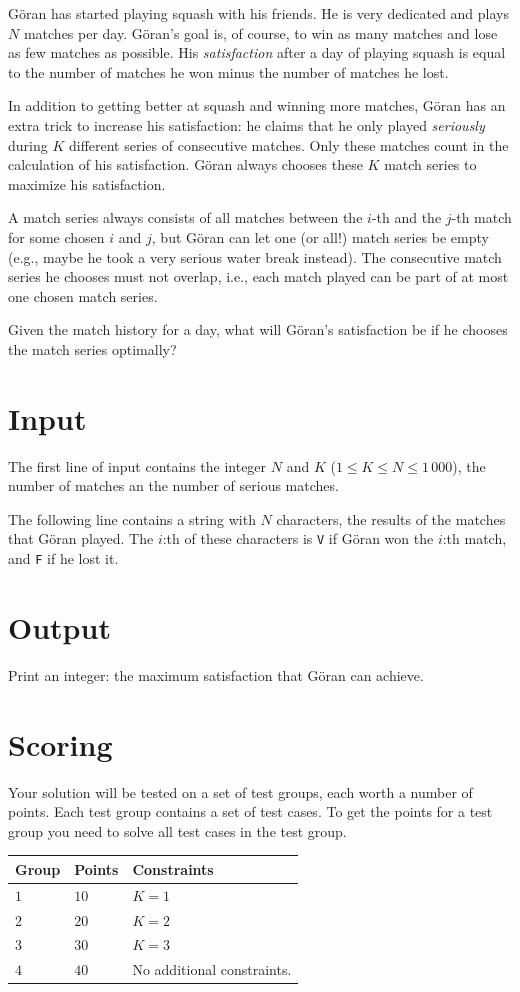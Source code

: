 
Göran has started playing squash with his friends. He is very dedicated and plays $N$ matches per day.
Göran's goal is, of course, to win as many matches and lose as few matches as possible.
His \emph{satisfaction} after a day of playing squash is equal to the number of matches he won minus the number of matches he lost.

In addition to getting better at squash and winning more matches, Göran has an extra trick to increase
his satisfaction: he claims that he only played \emph{seriously} during $K$ different series of
consecutive matches. Only these matches count in the calculation of his satisfaction. Göran always chooses
these $K$ match series to maximize his satisfaction.

A match series always consists of all matches between the $i$-th and the $j$-th match for some chosen
$i$ and $j$, but Göran can let one (or all!) match series be empty (e.g., maybe he took a very serious
water break instead). The consecutive match series he chooses must not overlap, i.e., each match played
can be part of at most one chosen match series.

Given the match history for a day, what will Göran's satisfaction be if he chooses the match series optimally?


\section*{Input}
The first line of input contains the integer $N$ and $K$ ($1 \leq K \leq N \leq 1\,000$), the number
of matches an the number of serious matches.

The following line contains a string with $N$ characters, the results of the matches that Göran played.
The $i$:th of these characters is \texttt{V} if Göran won the $i$:th match, and \texttt{F} if he lost it.

\section*{Output}
Print an integer: the maximum satisfaction that Göran can achieve.

\section*{Scoring}
Your solution will be tested on a set of test groups, each worth a number of points. Each test group contains
a set of test cases. To get the points for a test group you need to solve all test cases in the test group.

\noindent
\begin{tabular}{| l | l | p{12cm} |}
  \hline
  \textbf{Group} & \textbf{Points} & \textbf{Constraints} \\ \hline
  $1$    & $10$      & $K = 1$ \\ \hline
  $2$    & $20$      & $K = 2$ \\ \hline
  $3$    & $30$      & $K = 3$ \\ \hline
  $4$    & $40$      & No additional constraints. \\ \hline
\end{tabular}
